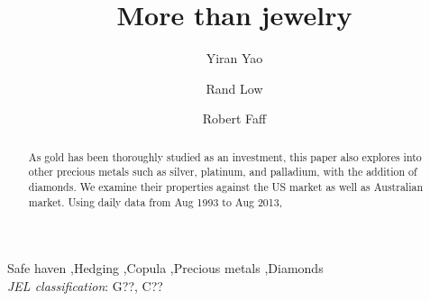 \begin{frontmatter}
\title{More than jewelry}





\author[uqbs1]{Yiran Yao}
\author[uqbs1]{Rand Low}%
\author[ncc]{Robert Faff}%


\address[uqbs1]{UQ Business School, University of Queensland, Brisbane, 4072, Australia}
\address[ncc]{Another University}




\begin{abstract}
As gold has been thoroughly studied as an investment, this paper also explores into other precious metals such as silver, platinum, and palladium, with the addition of diamonds. We examine their properties against the US market as well as Australian market. Using daily data from Aug 1993 to Aug 2013, 


\end{abstract}




\begin{keyword}
Safe haven \sep Hedging \sep Copula \sep Precious metals \sep Diamonds  \\
\emph{JEL classification}: G??, C?? \\
\end{keyword}

\end{frontmatter}
